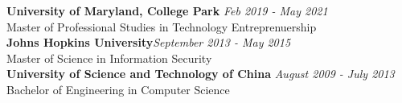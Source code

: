 \documentclass[3pt]{article}
\newenvironment{changemargin}[2]{%
  \begin{list}{}{%
    \setlength{\topsep}{0pt}%
    \setlength{\leftmargin}{#1}%
    \setlength{\rightmargin}{#2}%
    \setlength{\listparindent}{\parindent}%
    \setlength{\itemindent}{\parindent}%
    \setlength{\parsep}{\parskip}%
  }%
  \item[]}{\end{list}
}
\newcommand{\lineover}{
	\begin{changemargin}{-0.05in}{-0.05in}
		\vspace*{-8pt}
		\hrulefill \\
		\vspace*{-2pt}
	\end{changemargin}
}
\newcommand{\header}[1]{
	\begin{changemargin}{-0.5in}{-0.5in}
		{\Large \scshape{#1}}\\
  	\lineover
	\end{changemargin}
}
\newenvironment{body} {
	\vspace*{-16pt}
	\begin{changemargin}{-0.25in}{-0.5in}
  }	
	{\end{changemargin}
}
\begin{document}
\begin{body}
	\vspace{17pt}
	\textbf{University of Maryland, College Park} \hfill \emph{Feb 2019 - May 2021} \\
	Master of Professional Studies in Technology Entreprenuership \\
  \smallskip
	\textbf{Johns Hopkins University}{}\hfill \emph{September 2013 - May 2015}{} \\
	Master of Science in Information Security \hfill \\
  \smallskip
	\textbf{University of Science and Technology of China} \hfill \emph{August 2009 - July 2013} \\
	Bachelor of Engineering in Computer Science \\
\end{body}

\bigskip



%	


 
	
\end{document}
